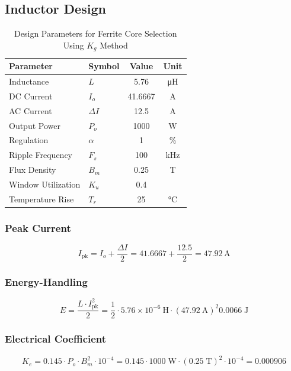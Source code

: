 \subsection{Inductor Design}
\begin{table}[h]
\centering
\caption{Design Parameters for Ferrite Core Selection Using \( K_g \) Method}
\label{tab:core_parameters}
\begin{tabular}{llSS}
\toprule
\textbf{Parameter} & \textbf{Symbol} & \textbf{Value} & \textbf{Unit} \\
\midrule
Inductance & \( L \) & 5.76 & \si{\micro\henry} \\
DC Current & \( I_o \) & 41.6667 & \si{\ampere} \\
AC Current & \( \Delta I \) & 12.5 & \si{\ampere} \\
Output Power & \( P_o \) & 1000 & \si{\watt} \\
Regulation & \( \alpha \) & 1 & \% \\
Ripple Frequency & \( F_s \) & 100 & \si{\kilo\hertz} \\
Flux Density & \( B_m \) & 0.25 & \si{\tesla} \\
Window Utilization & \( K_u \) & 0.4 &  \\
Temperature Rise & \( T_r \) & 25 & \si{\degreeCelsius} \\
\bottomrule
\end{tabular}
\end{table}
\subsubsection*{Peak Current}
\begin{equation}
I_{\text{pk}} = I_o + \frac{\Delta I}{2} 
= 41.6667 + \frac{12.5}{2}
= \boxed{47.92\,\text{A}}
\end{equation}

\subsubsection*{Energy-Handling}
\begin{equation}
E = \frac{L \cdot I_{\text{pk}}^2}{2} 
= \frac{1}{2} \cdot 5.76 \times 10^{-6}\ \text{H} \cdot (47.92\ \text{A})^2 
\boxed{0.0066\;\text{J}}
\end{equation}

\subsubsection*{Electrical Coefficient}
\begin{equation}
 K_e = 0.145 \cdot P_o \cdot B_m^2 \cdot 10^{-4} 
=  0.145 \cdot 1000\;\text{W} \cdot (0.25\;\text{T})^2 \cdot 10^{-4}
=  \boxed{0.000906}
\end{equation}

